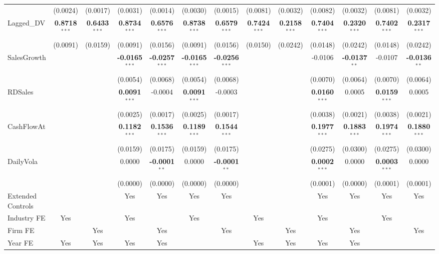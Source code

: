 \begin{landscape}
\begin{table}[H]
\begin{tabular}{lcccccccccccc}
 & (0.0024) & (0.0017) & (0.0031) & (0.0014) & (0.0030) & (0.0015) & (0.0081) & (0.0032) & (0.0082) & (0.0032) & (0.0081) & (0.0032) \\
Lagged\_DV & \textbf{0.8718}$^{***}$ & \textbf{0.6433}$^{***}$ & \textbf{0.8734}$^{***}$ & \textbf{0.6576}$^{***}$ & \textbf{0.8738}$^{***}$ & \textbf{0.6579}$^{***}$ & \textbf{0.7424}$^{***}$ & \textbf{0.2158}$^{***}$ & \textbf{0.7404}$^{***}$ & \textbf{0.2320}$^{***}$ & \textbf{0.7402}$^{***}$ & \textbf{0.2317}$^{***}$ \\
 & (0.0091) & (0.0159) & (0.0091) & (0.0156) & (0.0091) & (0.0156) & (0.0150) & (0.0242) & (0.0148) & (0.0242) & (0.0148) & (0.0242) \\
SalesGrowth &  &  & \textbf{-0.0165}$^{***}$ & \textbf{-0.0257}$^{***}$ & \textbf{-0.0165}$^{***}$ & \textbf{-0.0256}$^{***}$ &  &  & -0.0106 & \textbf{-0.0137}$^{**}$ & -0.0107 & \textbf{-0.0136}$^{**}$ \\
 &  &  & (0.0054) & (0.0068) & (0.0054) & (0.0068) &  &  & (0.0070) & (0.0064) & (0.0070) & (0.0064) \\
RDSales &  &  & \textbf{0.0091}$^{***}$ & -0.0004 & \textbf{0.0091}$^{***}$ & -0.0003 &  &  & \textbf{0.0160}$^{***}$ & 0.0005 & \textbf{0.0159}$^{***}$ & 0.0005 \\
 &  &  & (0.0025) & (0.0017) & (0.0025) & (0.0017) &  &  & (0.0038) & (0.0021) & (0.0038) & (0.0021) \\
CashFlowAt &  &  & \textbf{0.1182}$^{***}$ & \textbf{0.1536}$^{***}$ & \textbf{0.1189}$^{***}$ & \textbf{0.1544}$^{***}$ &  &  & \textbf{0.1977}$^{***}$ & \textbf{0.1883}$^{***}$ & \textbf{0.1974}$^{***}$ & \textbf{0.1880}$^{***}$ \\
 &  &  & (0.0159) & (0.0175) & (0.0159) & (0.0175) &  &  & (0.0275) & (0.0300) & (0.0275) & (0.0300) \\
DailyVola &  &  & 0.0000 & \textbf{-0.0001}$^{**}$ & 0.0000 & \textbf{-0.0001}$^{**}$ &  &  & \textbf{0.0002}$^{***}$ & 0.0000 & \textbf{0.0003}$^{***}$ & 0.0000 \\
 &  &  & (0.0000) & (0.0000) & (0.0000) & (0.0000) &  &  & (0.0001) & (0.0000) & (0.0001) & (0.0001) \\
\midrule
Extended Controls &  &  & Yes & Yes & Yes & Yes &  &  & Yes & Yes & Yes & Yes \\
Industry FE & Yes &  & Yes &  & Yes &  & Yes &  & Yes &  & Yes &  \\
Firm FE &  & Yes &  & Yes &  & Yes &  & Yes &  & Yes &  & Yes \\
Year FE & Yes & Yes & Yes & Yes &  &  & Yes & Yes & Yes & Yes &  &  \\

\end{tabular}
\end{table}
\end{landscape}
